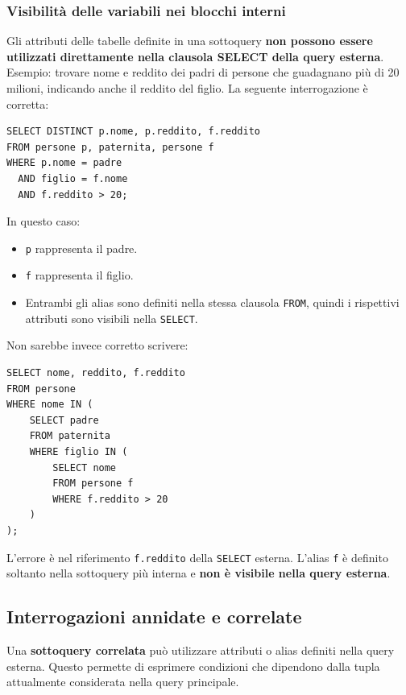 \subsubsection*{Visibilità delle variabili nei blocchi interni}
Gli attributi delle tabelle definite in una sottoquery
\textbf{non possono essere utilizzati direttamente nella
clausola SELECT della query esterna}.\\
\textcolor{verdeEsempio}{Esempio:} trovare nome e reddito dei padri di persone
che guadagnano più di 20 milioni, indicando anche il reddito del figlio.
La seguente interrogazione è corretta:
\begin{verbatim}
SELECT DISTINCT p.nome, p.reddito, f.reddito
FROM persone p, paternita, persone f
WHERE p.nome = padre
  AND figlio = f.nome
  AND f.reddito > 20;
\end{verbatim}
In questo caso:
\begin{itemize}
    \item \texttt{p} rappresenta il padre.
    \item \texttt{f} rappresenta il figlio.
    \item Entrambi gli alias sono definiti nella stessa
    clausola \texttt{FROM}, quindi i rispettivi attributi
    sono visibili nella \texttt{SELECT}.
\end{itemize}
Non sarebbe invece corretto scrivere:
\begin{verbatim}
SELECT nome, reddito, f.reddito
FROM persone
WHERE nome IN (
    SELECT padre
    FROM paternita
    WHERE figlio IN (
        SELECT nome
        FROM persone f
        WHERE f.reddito > 20
    )
);
\end{verbatim}
L'errore è nel riferimento \texttt{f.reddito} della
\texttt{SELECT} esterna.
L'alias \texttt{f} è definito soltanto nella sottoquery
più interna e \textbf{non è visibile nella query esterna}.

\subsection{Interrogazioni annidate e correlate}
Una \textbf{sottoquery correlata} può utilizzare attributi o alias
definiti nella query esterna.
Questo permette di esprimere condizioni che dipendono dalla tupla
attualmente considerata nella query principale.
